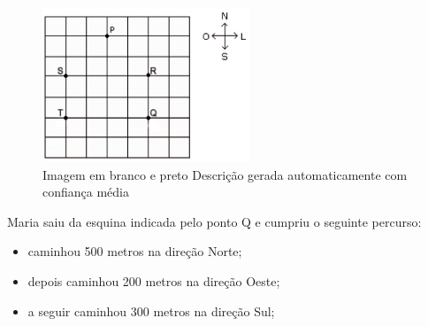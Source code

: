 \begin{escolha}
\begin{boxmedio}
\begin{boxmedio}
{\begin{boxpeq}
\begin{boxpeq}
{\begin{boxpeq}
\begin{boxmedio}
\begin{boxmedio}
\begin{boxpeq}
\begin{boxmedio}
\begin{boxpeq}
\begin{boxpeq}
\begin{boxpeq}
\begin{boxpeq}
\begin{boxmedio}
{\begin{boxmedio}
\begin{boxmedio}
\begin{boxpeq}
\begin{boxmedio}
\begin{boxpeq}
\begin{boxpeq}
\begin{boxpeq}
\begin{escolha}
{\begin{boxmedio}
\begin{boxpeq}
\begin{boxpeq}
\begin{boxpeq}
\begin{boxpeq}
\begin{boxpeq}
\begin{boxmedio}
\begin{boxpeq}
\begin{boxpeq}
\begin{boxpeq}
{\begin{boxpeq}
\begin{boxmedio}
\begin{boxpeq}
\begin{boxpeq}
\begin{boxpeq}
{\begin{boxpeq}
\begin{boxmedio}
{\begin{boxpeq}
\begin{boxpeq}
\begin{boxmedio}
\begin{boxmedio}
\begin{boxpeq}
\begin{boxpeq}
{\begin{boxpeq}
\begin{boxpeq}
\begin{boxpeq}
\begin{boxpeq}
\begin{boxpeq}
\begin{escolha}
\begin{escolha}
{\begin{boxmedio}
\begin{boxpeq}
\begin{q°}
\begin{boxmedio}
\begin{boxpeq}
\begin{boxpeq}
\begin{boxmedio}
\begin{boxmedio}
\begin{boxmedio}
\begin{figure}
\centering
\includegraphics[width=2.4375in,height=1.82292in]{./_SAEB_9_MAT/media/image202.png}
\caption{Imagem em branco e preto Descrição gerada automaticamente com
confiança média}
\end{figure}


Maria saiu da esquina indicada pelo ponto Q e cumpriu o seguinte
percurso:

\begin{itemize}
  \item caminhou 500 metros na direção Norte;

  \item depois caminhou 200 metros na direção Oeste;
  
  \item a seguir caminhou 300 metros na direção Sul;
  

\end{itemize}
\end{boxmedio}
\end{boxmedio}
\end{boxmedio}
\end{boxpeq}
\end{boxpeq}
\end{boxmedio}
\end{q°}
\end{boxpeq}
\end{boxmedio}}
\end{escolha}
\end{escolha}
\end{boxpeq}
\end{boxpeq}
\end{boxpeq}
\end{boxpeq}
\end{boxpeq}}
\end{boxpeq}
\end{boxpeq}
\end{boxmedio}
\end{boxmedio}
\end{boxpeq}
\end{boxpeq}}
\end{boxmedio}
\end{boxpeq}}
\end{boxpeq}
\end{boxpeq}
\end{boxpeq}
\end{boxmedio}
\end{boxpeq}}
\end{boxpeq}
\end{boxpeq}
\end{boxpeq}
\end{boxmedio}
\end{boxpeq}
\end{boxpeq}
\end{boxpeq}
\end{boxpeq}
\end{boxpeq}
\end{boxmedio}}
\end{escolha}
\end{boxpeq}
\end{boxpeq}
\end{boxpeq}
\end{boxmedio}
\end{boxpeq}
\end{boxmedio}
\end{boxmedio}}
\end{boxmedio}
\end{boxpeq}
\end{boxpeq}
\end{boxpeq}
\end{boxpeq}
\end{boxmedio}
\end{boxpeq}
\end{boxmedio}
\end{boxmedio}
\end{boxpeq}}
\end{boxpeq}
\end{boxpeq}}
\end{boxmedio}
\end{boxmedio}
\end{escolha}
